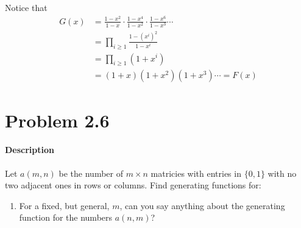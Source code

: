 \documentclass[a4paper,notitlepage]{article}
\theoremstyle{plain}
\theoremstyle{definition}
\begin{document}
Notice that
\begin{align*}
    G(x) &=  \frac{1-x^2}{1-x}\cdot \frac{1-x^4}{1-x^2} \cdot \frac{1-x^6}{1-x^3}\cdots \\
    &=  \prod_{i \geq 1}\frac{1-(x^i)^2}{1-x^i} \\
    &=  \prod_{i\geq 1}(1+x^i) \\
    &=  (1+x)(1+x^2)(1+x^3) \cdots = F(x)
\end{align*}

\newpage

\section*{Problem 2.6}
\paragraph{Description}
Let $a(m, n)$ be the number of $m\times n$ matricies with entries in $\{0,1\}$ with no two adjacent ones in rows or columns. Find generating functions for:
\begin{enumerate}
    \item For a fixed, but general, $m$, can you say anything about the generating function for the numbers $a(n, m)$?
\end{enumerate}
\end{document}

